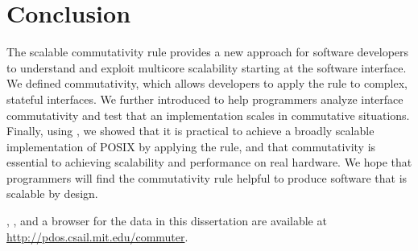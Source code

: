 \section{Conclusion}
\label{sec:concl}


The scalable commutativity rule provides a new approach for software
developers to understand and exploit multicore scalability starting at
the software interface.
%
We defined \SIM commutativity, which allows developers to apply the
rule to complex, stateful interfaces.
%
We further introduced \tool to help programmers analyze interface
commutativity and test that an implementation scales in commutative
situations.
%
Finally, using \sys, we showed that it is practical to achieve a
broadly scalable implementation of POSIX by applying the rule, and
that commutativity is essential to achieving scalability and
performance on real hardware.
%
We hope that programmers will find the commutativity rule helpful to
produce software that is scalable by design.

\tool, \sys, and a browser for the data in this dissertation are
available at
\url{http://pdos.csail.mit.edu/commuter}.
